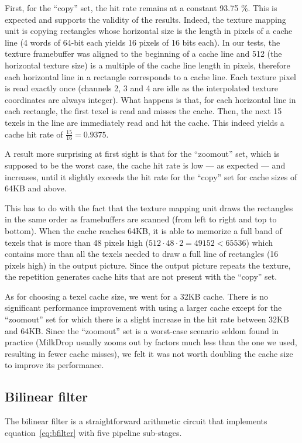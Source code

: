 \documentclass[a4paper,11pt]{kthesis}
\begin{document}
First, for the ``copy'' set, the hit rate remains at a constant 93.75 \%. This is expected and supports the validity of the results. Indeed, the texture mapping unit is copying rectangles whose horizontal size is the length in pixels of a cache line (4 words of 64-bit each yields 16 pixels of 16 bits each). In our tests, the texture framebuffer was aligned to the beginning of a cache line and 512 (the horizontal texture size) is a multiple of the cache line length in pixels, therefore each horizontal line in a rectangle corresponds to a cache line. Each texture pixel is read exactly once (channels 2, 3 and 4 are idle as the interpolated texture coordinates are always integer). What happens is that, for each horizontal line in each rectangle, the first texel is read and misses the cache. Then, the next 15 texels in the line are immediately read and hit the cache. This indeed yields a cache hit rate of $\frac{15}{16} = 0.9375$.

A result more surprising at first sight is that for the ``zoomout'' set, which is supposed to be the worst case, the cache hit rate is low --- as expected --- and increases, until it slightly exceeds the hit rate for the ``copy'' set for cache sizes of 64KB and above.

This has to do with the fact that the texture mapping unit draws the rectangles in the same order as framebuffers are scanned (from left to right and top to bottom). When the cache reaches 64KB, it is able to memorize a full band of texels that is more than 48 pixels high ($512\cdot48\cdot2 = 49152 < 65536$) which contains more than all the texels needed to draw a full line of rectangles (16 pixels high) in the output picture. Since the output picture repeats the texture, the repetition generates cache hits that are not present with the ``copy'' set.

As for choosing a texel cache size, we went for a 32KB cache. There is no significant performance improvement with using a larger cache except for the ``zoomout'' set for which there is a slight increase in the hit rate between 32KB and 64KB. Since the ``zoomout'' set is a worst-case scenario seldom found in practice (MilkDrop usually zooms out by factors much less than the one we used, resulting in fewer cache misses), we felt it was not worth doubling the cache size to improve its performance.

\subsection{Bilinear filter}
The bilinear filter is a straightforward arithmetic circuit that implements equation~\ref{eq:bfilter} with five pipeline sub-stages.
\end{document}
